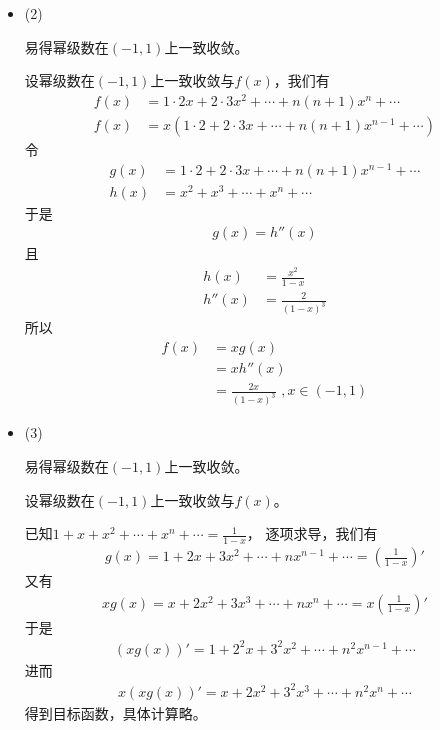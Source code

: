 \documentclass{article}
\begin{document}
\begin{itemize}
  \item (2)

        易得幂级数在$(-1, 1)$上一致收敛。

        设幂级数在$(-1, 1)$上一致收敛与$f(x)$，我们有
        \begin{align*}
          f(x) & = 1 \cdot 2 x + 2 \cdot 3 x^2 + \cdots + n(n + 1)x^n + \cdots       \\
          f(x) & = x(1 \cdot 2  + 2 \cdot 3 x + \cdots + n(n + 1)x^{n - 1} + \cdots)
        \end{align*}
        令
        \begin{align*}
          g(x) & = 1 \cdot 2  + 2 \cdot 3 x + \cdots + n(n + 1)x^{n - 1} + \cdots \\
          h(x) & = x^2 + x^3 + \cdots + x^n + \cdots
        \end{align*}
        于是
        \begin{align*}
          g(x) = h''(x)
        \end{align*}
        且
        \begin{align*}
          h(x)   & = \frac{x^2}{1 - x}   \\
          h''(x) & = \frac{2}{(1 - x)^3}
        \end{align*}
        所以
        \begin{align*}
          f(x) & = x g(x)                                     \\
               & = x h''(x)                                   \\
               & = \frac{2x}{(1 - x)^3} \, \, , x \in (-1, 1)
        \end{align*}

  \item (3)

        易得幂级数在$(-1, 1)$上一致收敛。

        设幂级数在$(-1, 1)$上一致收敛与$f(x)$。

        已知$1 + x + x^2 + \cdots + x^n + \cdots = \frac{1}{1 - x}$，
        逐项求导，我们有
        \begin{align*}
          g(x) = 1 + 2 x + 3 x^2 + \cdots + n x^{n - 1} + \cdots = (\frac{1}{1 - x})'
        \end{align*}
        又有
        \begin{align*}
          x g(x) = x + 2 x^2 + 3 x^3 + \cdots + n x^{n} + \cdots = x (\frac{1}{1 - x})'
        \end{align*}
        于是
        \begin{align*}
          (xg(x))' = 1 + 2^2 x + 3^2 x^2 + \cdots + n^2 x^{n - 1} + \cdots
        \end{align*}
        进而
        \begin{align*}
          x (xg(x))' = x + 2 x^2 + 3^2 x^3 + \cdots + n^2 x^{n} + \cdots
        \end{align*}
        得到目标函数，具体计算略。
\end{itemize}
\end{document}
